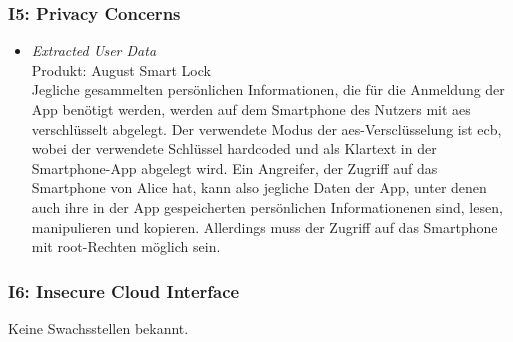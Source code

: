     \subsubsection*{I5: Privacy Concerns}
        \begin{itemize}[leftmargin=0cm,label={}]
            \item \emph{Extracted User Data}\cite{Lariviere2015,Ye2017}\label{vuln:userdata}\\
                Produkt: August Smart Lock\\ 
                Jegliche gesammelten persönlichen Informationen, die für die Anmeldung der App benötigt werden, werden auf dem Smartphone des Nutzers mit \gls{aes} verschlüsselt abgelegt. 
                Der verwendete Modus der \gls{aes}-Versclüsselung ist \gls{ecb}, wobei der verwendete Schlüssel hardcoded und als Klartext in der Smartphone-App abgelegt wird. 
    		    Ein Angreifer, der Zugriff auf das Smartphone von Alice hat, kann also jegliche Daten der App, unter denen auch ihre in der App gespeicherten persönlichen Informationenen sind, lesen, manipulieren und kopieren. 
    		    Allerdings muss der Zugriff auf das Smartphone mit root-Rechten möglich sein.
        \end{itemize}
        
    \subsubsection*{I6: Insecure Cloud Interface}
        Keine Swachsstellen bekannt.
        
